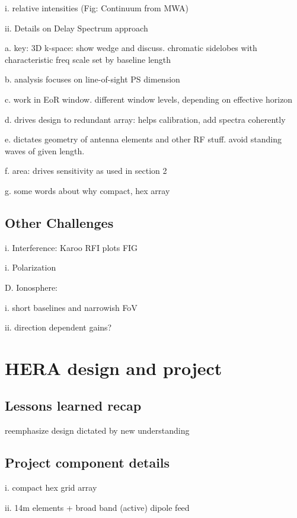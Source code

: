 \documentclass[preprint]{aastex}
\begin{document}
i. relative intensities (Fig: Continuum from MWA)

ii. Details on Delay Spectrum approach

a. key: 3D k-space: show wedge and discuss. chromatic sidelobes with characteristic freq scale 
set by baseline length

b. analysis focuses on line-of-sight PS dimension

c. work in EoR window.  different window levels, depending on effective horizon

d. drives design to redundant array: helps calibration, add spectra coherently

e. dictates geometry of antenna elements and other RF stuff. avoid standing waves of given length. 

f. area: drives sensitivity as used in section 2

g. some words about why compact, hex array 

\subsection{Other Challenges} %

i. Interference: Karoo RFI plots  FIG 

i. Polarization 

D. Ionosphere: 

i. short baselines and narrowish FoV

ii. direction dependent gains?


\section{HERA design and project} %

\subsection{Lessons learned recap} %

reemphasize design dictated by new understanding

\subsection{Project component details}  %

i. compact hex grid array

ii. 14m elements + broad band (active) dipole feed
\end{document}
